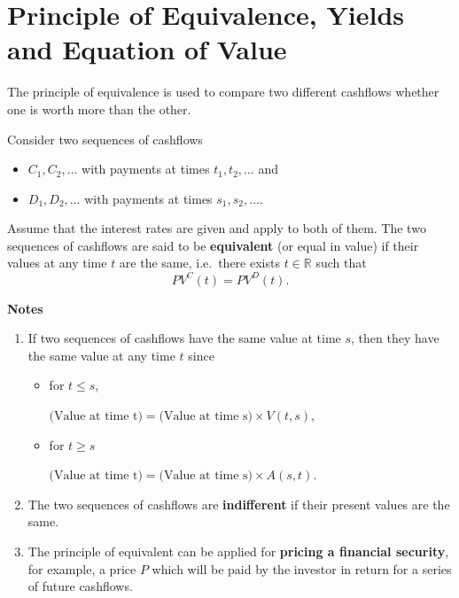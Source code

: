 \documentclass[
]{book}
\theoremstyle{definition}
\theoremstyle{definition}
\theoremstyle{definition}
\theoremstyle{definition}
\theoremstyle{remark}
\begin{document}
\hypertarget{principle-of-equivalence-yields-and-equation-of-value}{%
\section{Principle of Equivalence, Yields and Equation of Value}\label{principle-of-equivalence-yields-and-equation-of-value}}

The principle of equivalence is used to compare two different cashflows
whether one is worth more than the other.

Consider two sequences of cashflows

\begin{itemize}
\item
  \(C_1, C_2, \ldots\) with payments at times \(t_1, t_2, \ldots\) and
\item
  \(D_1, D_2, \ldots\) with payments at times \(s_1, s_2, \ldots\).
\end{itemize}

Assume that the interest rates are given and apply to both of them. The
two sequences of cashflows are said to be \textbf{equivalent} (or equal in
value) if their values at any time \(t\) are the same, i.e.~there exists
\(t \in \mathbb{R}\) such that \[PV^C(t)  = PV^D(t).\]

\textbf{Notes}

\begin{enumerate}
\def\labelenumi{\arabic{enumi}.}
\item
  If two sequences of cashflows have the same value at time \(s\), then
  they have the same value at any time \(t\) since

  \begin{itemize}
  \item
    for \(t \le s\),

    \(\text{(Value at time t)} = \text{(Value at time s)} \times V(t,s),\)
  \item
    for \(t \ge s\)

    \(\text{(Value at time t)} = \text{(Value at time s)} \times A(s,t).\)
  \end{itemize}
\item
  The two sequences of cashflows are \textbf{indifferent} if their present
  values are the same.
\item
  The principle of equivalent can be applied for \textbf{pricing a financial
  security}, for example, a price \(P\) which will be paid by the
  investor in return for a series of future cashflows.
\end{enumerate}
\end{document}
